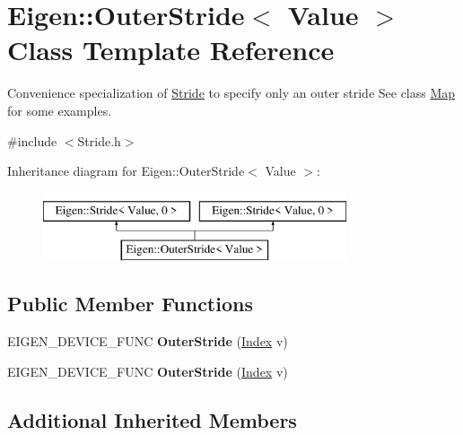 \hypertarget{class_eigen_1_1_outer_stride}{}\section{Eigen\+:\+:Outer\+Stride$<$ Value $>$ Class Template Reference}
\label{class_eigen_1_1_outer_stride}


Convenience specialization of \hyperlink{group___core___module_class_eigen_1_1_stride}{Stride} to specify only an outer stride See class \hyperlink{group___core___module_class_eigen_1_1_map}{Map} for some examples.  




{\ttfamily \#include $<$Stride.\+h$>$}

Inheritance diagram for Eigen\+:\+:Outer\+Stride$<$ Value $>$\+:\begin{figure}[H]
\begin{center}
\leavevmode
\includegraphics[height=2.000000cm]{class_eigen_1_1_outer_stride}
\end{center}
\end{figure}
\subsection*{Public Member Functions}
\begin{DoxyCompactItemize}
\item 
\mbox{\label{class_eigen_1_1_outer_stride_ac095c1e78785f794d07a6ba63c29c86c}} 
E\+I\+G\+E\+N\+\_\+\+D\+E\+V\+I\+C\+E\+\_\+\+F\+U\+NC {\bfseries Outer\+Stride} (\hyperlink{group___core___module_a96c2dfb0ce43fd8e19adcdf6094f5f63}{Index} v)
\item 
\mbox{\label{class_eigen_1_1_outer_stride_ac095c1e78785f794d07a6ba63c29c86c}} 
E\+I\+G\+E\+N\+\_\+\+D\+E\+V\+I\+C\+E\+\_\+\+F\+U\+NC {\bfseries Outer\+Stride} (\hyperlink{group___core___module_a96c2dfb0ce43fd8e19adcdf6094f5f63}{Index} v)
\end{DoxyCompactItemize}
\subsection*{Additional Inherited Members}


